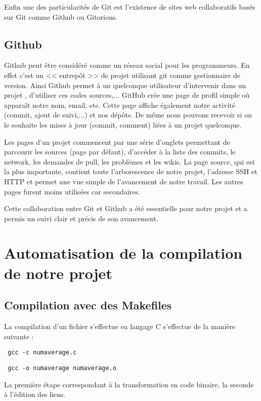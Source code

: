 Enfin une des particularit\'es de Git est l'existence de sites web collaboratifs bas\'es sur Git comme Github ou Gitorious. 

\subsection{Github}

Github peut \^etre consid\'er\'e comme un r\'eseau social pour les programmeurs. En effet c'est un << entrep\^ot >> de projet utilisant git comme 
gestionnaire de version. Ainsi Github permet \`a un quelconque utilisateur d'intervenir dans un projet , d'utiliser ces codes sources,...
GitHub cr\'ee une page de profil simple o\`u appara\^it notre nom, email, etc. Cette page affiche \'egalement notre activit\'e (commit, ajout de suivi,...)
 et nos d\'ep\^ots. De m\^eme nous pouvons recevoir si on le souhaite les mises \`a  jour (commit, comment) li\'ees \`a un projet quelconque.

Les pages d'un projet commencent par une s\'erie d'onglets permettant de parcourir les sources (page par d\'efaut), d'acc\'eder \`a la liste des
 commits, le network, les demandes de pull, les probl\`emes et les wikis.
La page source, qui est la plus importante, contient toute l'arborescence de notre projet, l'adresse SSH et HTTP et permet une vue simple
 de l'avancement de notre travail.
Les autres pages furent moins utilis\'ees car secondaires. 

Cette collaboration entre Git et Github a \'et\'e essentielle pour notre projet et a permis un suivi clair et pr\'ecis de son avancement.

\section{Automatisation de la compilation de notre projet}
\subsection{Compilation avec des Makefiles}

La compilation d'un fichier s'effectue en langage C s'effectue de la mani\`ere suivante :
\begin{verbatim} gcc -c numaverage.c\end{verbatim}
\begin{verbatim} gcc -o numaverage numaverage.o\end{verbatim}

La premi\`ere \'etape correspondant \`a la transformation en code binaire, la seconde \`a l'\'edition des liens.

